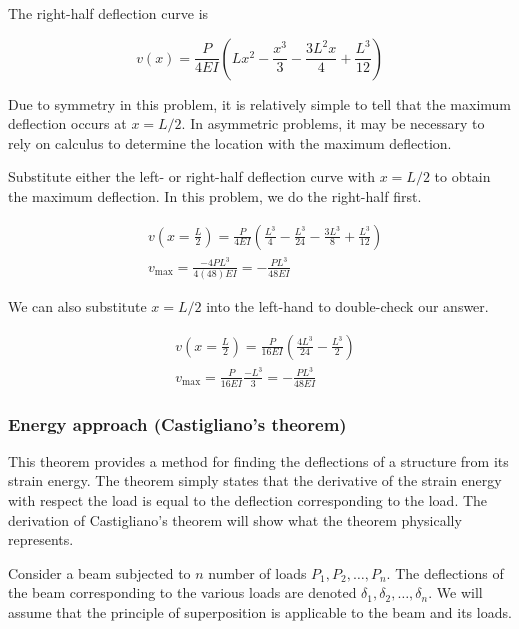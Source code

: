 \documentclass[
10pt,
a4paper,
openany,
svgnames,
]{book}
\begin{document}
\begin{solution}
  The right-half deflection curve is

  \begin{equation*}
    v(x) = \frac{P}{4EI} \left( Lx^2 - \frac{x^3}{3} - \frac{3L^2x}{4} + \frac{L^3}{12} \right)
  \end{equation*}

  Due to symmetry in this problem, it is relatively simple to tell that the maximum deflection occurs at $x = L/2$. In asymmetric problems, it may be necessary to rely on calculus to determine the location with the maximum deflection.

  Substitute either the left- or right-half deflection curve with $x = L/2$ to obtain the maximum deflection. In this problem, we do the right-half first.

  \begin{align*}
    &v(x = \frac{L}{2}) = \frac{P}{4EI} \left( \frac{L^3}{4} - \frac{L^3}{24} - \frac{3L^3}{8} + \frac{L^3}{12} \right) \\
    &v_{\max} = \frac{-4PL^3}{4(48)EI} = -\frac{PL^3}{48EI}
  \end{align*}

  We can also substitute $x = L/2$ into the left-hand to double-check our answer.

  \begin{align*}
    &v(x = \frac{L}{2}) = \frac{P}{16EI} \left( \frac{4L^3}{24} - \frac{L^3}{2}\right) \\
    &v_{\max} = \frac{P}{16EI} \frac{-L^3}{3} = -\frac{PL^3}{48EI}
  \end{align*}
  
\end{solution}  

\subsubsection{Energy approach (Castigliano’s theorem)} \label{subsub: energy method}

This theorem provides a method for finding the deflections of a structure from its strain energy. The theorem simply states that the derivative of the strain energy with respect the load is equal to the deflection corresponding to the load. The derivation of Castigliano’s theorem will show what the theorem physically represents.

Consider a beam subjected to $n$ number of loads $P_1, P_2, \ldots, P_n$. The deflections of the beam corresponding to the various loads are denoted $\delta_1, \delta_2, \ldots, \delta_n$. We will assume that the principle of superposition is applicable to the beam and its loads.
\end{document}
